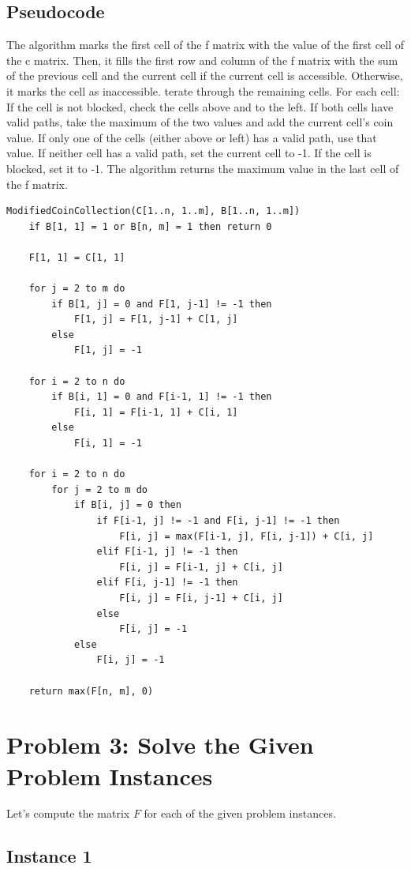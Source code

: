 \subsection{Pseudocode}
The algorithm marks the first cell of the f matrix with the value of the first cell of the c matrix. Then, it fills the first row and column of the f matrix with the sum of the previous cell and the current cell if the current cell is accessible. 
Otherwise, it marks the cell as inaccessible. 
terate through the remaining cells. For each cell:
If the cell is not blocked, check the cells above and to the left. If both cells have valid paths, take the maximum of the two values and add the current cell's coin value.
If only one of the cells (either above or left) has a valid path, use that value.
If neither cell has a valid path, set the current cell to -1.
If the cell is blocked, set it to -1.
The algorithm returns the maximum value in the last cell of the f matrix.
\begin{verbatim}
ModifiedCoinCollection(C[1..n, 1..m], B[1..n, 1..m])
    if B[1, 1] = 1 or B[n, m] = 1 then return 0
    
    F[1, 1] = C[1, 1]
    
    for j = 2 to m do
        if B[1, j] = 0 and F[1, j-1] != -1 then
            F[1, j] = F[1, j-1] + C[1, j]
        else
            F[1, j] = -1
    
    for i = 2 to n do
        if B[i, 1] = 0 and F[i-1, 1] != -1 then
            F[i, 1] = F[i-1, 1] + C[i, 1]
        else
            F[i, 1] = -1
    
    for i = 2 to n do
        for j = 2 to m do
            if B[i, j] = 0 then
                if F[i-1, j] != -1 and F[i, j-1] != -1 then
                    F[i, j] = max(F[i-1, j], F[i, j-1]) + C[i, j]
                elif F[i-1, j] != -1 then
                    F[i, j] = F[i-1, j] + C[i, j]
                elif F[i, j-1] != -1 then
                    F[i, j] = F[i, j-1] + C[i, j]
                else
                    F[i, j] = -1
            else
                F[i, j] = -1
    
    return max(F[n, m], 0)
\end{verbatim}

\section{Problem 3: Solve the Given Problem Instances}
Let's compute the matrix $F$ for each of the given problem instances.
\subsection{Instance 1}
